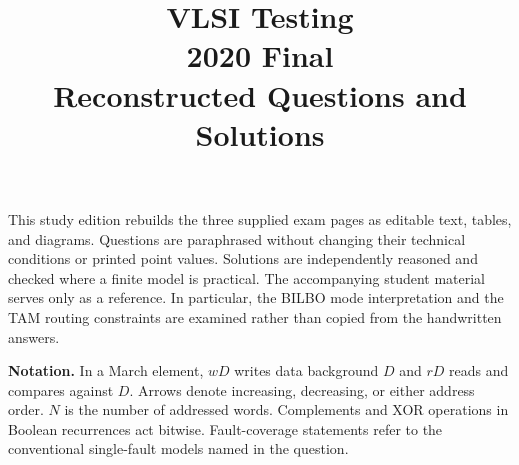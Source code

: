 \documentclass[11pt,a4paper]{article}
\title{VLSI Testing\\2020 Final\\Reconstructed Questions and Solutions}
\author{}
\date{}
\begin{document}
\maketitle
\noindent This study edition rebuilds the three supplied exam pages as editable text, tables, and diagrams. Questions are paraphrased without changing their technical conditions or printed point values. Solutions are independently reasoned and checked where a finite model is practical. The accompanying student material serves only as a reference. In particular, the BILBO mode interpretation and the TAM routing constraints are examined rather than copied from the handwritten answers.
\par\medskip
\noindent\textbf{Notation.} In a March element, $wD$ writes data background $D$ and $rD$ reads and compares against $D$. Arrows denote increasing, decreasing, or either address order. $N$ is the number of addressed words. Complements and XOR operations in Boolean recurrences act bitwise. Fault-coverage statements refer to the conventional single-fault models named in the question.



\end{document}
